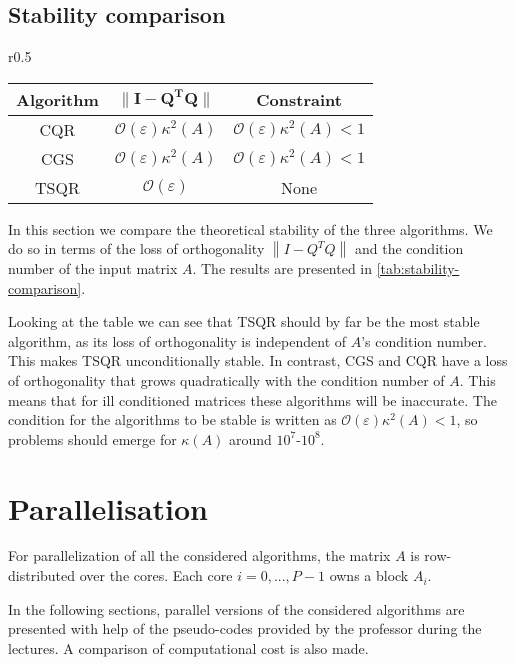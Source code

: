 \documentclass[a4paper, 12pt,oneside]{article}
\begin{document}
		\subsection{Stability comparison}
		\begin{wraptable}[9]{r}{0.5\textwidth}
			\centering
			\vspace{-3em}
			\begin{tabular}{|c|c|c|}
			\hline
			\bf{Algorithm}   & $\mathbf{\|I-Q^TQ\|}$ & \bf{Constraint}  \\ \hline
			CQR & $\mathcal{O}(\varepsilon)\kappa^2(A)$  & $\mathcal{O}(\varepsilon)\kappa^2(A)<1$   \\  \hline
			CGS & $\mathcal{O}(\varepsilon)\kappa^2(A)$ & $\mathcal{O}(\varepsilon)\kappa^2(A)<1$ \\ \hline
			TSQR & $\mathcal{O}(\varepsilon)$  & None \\ \hline
			\end{tabular}
			\caption{Stability information for the considered algorithms. This data comes from the slides of the class.}
			\label{tab:stability-comparison}
		\end{wraptable}
		In this section we compare the theoretical stability of the three algorithms. We do so in terms of the loss of orthogonality $\left\|I-Q^T Q\right\|$ and the condition number of the input matrix $A$. The results are presented in \ref{tab:stability-comparison}.

		Looking at the table we can see that TSQR should by far be the most stable algorithm, as its loss of orthogonality is independent of $A$'s condition number. This makes TSQR unconditionally stable. In contrast, CGS and CQR have a loss of orthogonality that grows quadratically with the condition number of $A$. This means that for ill conditioned matrices these algorithms will be inaccurate. The condition for the algorithms to be stable is written as $\mathcal{O}(\varepsilon)\kappa^2(A)<1$, so problems should emerge for $\kappa(A)$ around $10^7$-$10^8$. 
	\section{Parallelisation}
		For parallelization of all the considered algorithms, the matrix ${A}$ is row-distributed over the cores. Each core $i=0,...,P-1$ owns a block ${A}_i$.
		
		In the following sections, parallel versions of the considered algorithms are presented with help of the pseudo-codes provided by the professor during the lectures. A comparison of computational cost is also made.
\end{document}
